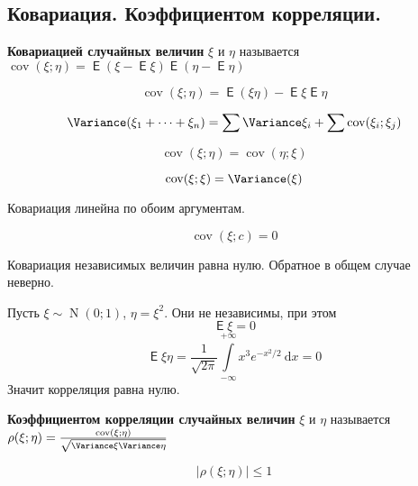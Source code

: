 \documentclass{article}
\DeclareMathOperator{\Expected}{\mathsf{E}}
\DeclareMathOperator{\Covariance}{cov}
\begin{document}
    \subsection{Ковариация. Коэффициентом корреляции.}
    \begin{definition}
        \textbf{Ковариацией случайных величин} $\xi$ и $\eta$ называется $\Covariance(\xi;\eta)=\Expected(\xi-\Expected\xi)\Expected(\eta-\Expected\eta)$
    \end{definition}
    \begin{property}
        $$
        \Covariance(\xi;\eta)=\Expected(\xi\eta)-\Expected\xi\Expected\eta
        $$
    \end{property}
    \begin{property}
        $$
        \Variance(\xi_1+\cdots+\xi_n)=\sum\Variance\xi_i+\sum\Covariance(\xi_i;\xi_j)
        $$
    \end{property}
    \begin{property}
        $$
        \Covariance(\xi;\eta)=\Covariance(\eta;\xi)
        $$
    \end{property}
    \begin{property}
        $$
        \Covariance(\xi;\xi)=\Variance(\xi)
        $$
    \end{property}
    \begin{property}
        Ковариация линейна по обоим аргументам.
    \end{property}
    \begin{property}
        $$
        \Covariance(\xi;c)=0
        $$
    \end{property}
    \begin{property}
        Ковариация независимых величин равна нулю. Обратное в общем случае неверно.
    \end{property}
    \begin{example}
        Пусть $\xi\sim\hyperref[N]{\operatorname{N}(0;1)}$, $\eta=\xi^2$. Они не независимы, при этом
        $$
        \Expected\xi=0
        $$
        $$
        \Expected\xi\eta=\frac1{\sqrt{2\pi}}\int\limits_{-\infty}^{+\infty}x^3e^{-x^2/2}~\mathrm dx=0
        $$
        Значит корреляция равна нулю.
    \end{example}
    \begin{definition}
        \textbf{Коэффициентом корреляции случайных величин} $\xi$ и $\eta$ называется $\rho(\xi;\eta)=\frac{\Covariance(\xi;\eta)}{\sqrt{\Variance\xi\Variance\eta}}$
    \end{definition}
    \begin{property}
        $$
        |\rho(\xi;\eta)|\leqslant1
        $$
    \end{property}
\end{document}
